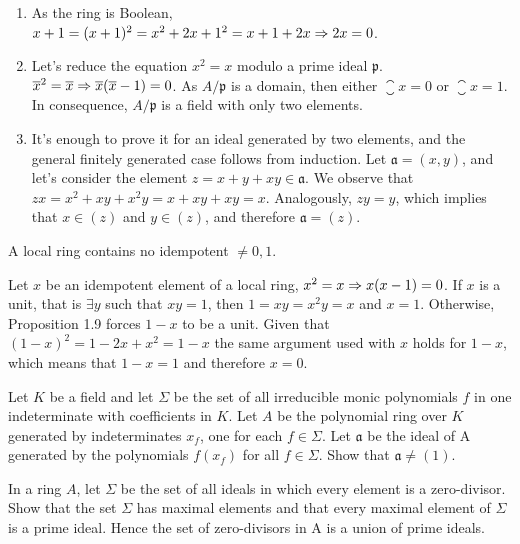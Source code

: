 \begin{sol}
	\begin{enumerate}[label=(\roman*)]
		\item As the ring is Boolean, $x+1 = (x+1)^2 = x^2 + 2x + 1^2 = x + 1 + 2x \Rightarrow 2x = 0$.
		\item Let's reduce the equation $x^2 = x$ modulo a prime ideal $\mathfrak{p}$. $\overline{x}^2 = \overline{x} \Rightarrow \overline{x}(\overline{x}-1) = 0$. As $A/\mathfrak{p}$ is a domain, then either $\closure{x} = 0$ or $\closure{x} = 1$. In consequence, $A/\mathfrak{p}$ is a field with only two elements.
		\item It's enough to prove it for an ideal generated by two elements, and the general finitely generated case follows from induction. Let $\mathfrak{a} = (x,y)$, and let's consider the element $z = x+y+xy \in \mathfrak{a}$. We observe that $zx = x^2 + xy + x^2y = x + xy + xy = x$. Analogously, $zy = y$, which implies that $x \in (z)$ and $y \in (z)$, and therefore $\mathfrak{a} = (z)$.
	\end{enumerate}
\end{sol}

\begin{ex}
	A local ring contains no idempotent $\neq 0, 1$.
\end{ex}

\begin{sol}
	Let $x$ be an idempotent element of a local ring, $x^2 = x \Rightarrow x(x-1) = 0$. If $x$ is a unit, that is $\exists y$ such that $xy = 1$, then $1 = xy = x^2y = x$ and $x = 1$. Otherwise, Proposition 1.9 forces $1-x$ to be a unit. Given that $(1-x)^2 = 1-2x+x^2 = 1-x$ the same argument used with $x$ holds for $1-x$, which means that $1-x = 1$ and therefore $x = 0$.
\end{sol}

\begin{ex}
	Let $K$ be a field and let $\Sigma$ be the set of all irreducible monic polynomials $f$ in one indeterminate with coefficients in $K$. Let $A$ be the polynomial ring over $K$ generated by indeterminates $x_f$, one for each $f \in \Sigma$. Let $\mathfrak{a}$ be the ideal of A generated by the polynomials $f(x_f)$ for all $f \in \Sigma$. Show that $\mathfrak{a} \neq (1)$.
\end{ex}

\begin{sol}
	
\end{sol}

\begin{ex}
	In a ring $A$, let $\Sigma$ be the set of all ideals in which every element is a zero-divisor. Show that the set $\Sigma$ has maximal elements and that every maximal element of $\Sigma$ is a prime ideal. Hence the set of zero-divisors in A is a union of prime ideals.
\end{ex}

